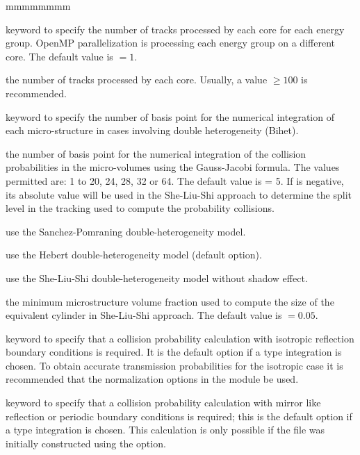 \begin{ListeDeDescription}{mmmmmmmm}
\item[\moc{BATCH}] keyword to specify the number of tracks processed by each core for each energy group. OpenMP parallelization is processing each energy group on a different core. The default value is  $=1$.

\item[\dusa{nbatch}] the number of tracks processed by each core. Usually, a value  $\ge 100$ is recommended.

\item[\moc{QUAB}] keyword to specify the number of basis point for the
numerical integration of each micro-structure in cases involving double
heterogeneity (Bihet).

\item[\dusa{iquab}] the number of basis point for the numerical integration of
the collision probabilities in the micro-volumes using the Gauss-Jacobi
formula. The values permitted are: 1 to 20, 24, 28, 32 or 64. The default value
is  = 5. If  is negative, its absolute value will be used in the She-Liu-Shi approach to determine the
split level in the tracking used to compute the probability collisions.

\item[\moc{SAPO}] use the Sanchez-Pomraning double-heterogeneity model.\cite{sapo}

\item[\moc{HEBE}] use the Hebert double-heterogeneity model (default option).\cite{BIHET}

\item[\moc{SLSI}] use the She-Liu-Shi double-heterogeneity model without shadow effect.\cite{She2017}

\item[\dusa{frtm}] the minimum microstructure volume fraction used to compute the size of the equivalent cylinder in She-Liu-Shi approach. The default value is  $=0.05$.

\item[\moc{PISO}] keyword to specify that a collision probability calculation with isotropic reflection boundary 
conditions is required. It is the default option if a  type integration is chosen. To obtain accurate
transmission probabilities for the isotropic case it is recommended that the normalization 
options in the  module be used. 

\item[\moc{PSPC}] keyword to specify that a collision probability calculation with mirror like reflection or periodic 
boundary conditions is required; this is the default option if a  type integration is chosen. 
This calculation is only possible if the file was initially constructed using the  option. 


\end{ListeDeDescription}
